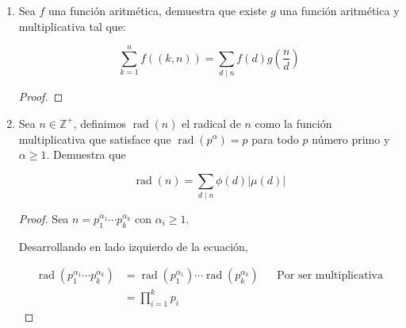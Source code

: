 \documentclass[letterpaper]{article}
\newcommand{\Z}{\mathbb{Z}}
\DeclareMathOperator{\rad}{rad}
\begin{document}
\begin{enumerate}
Ahora solo hace falta probar $(*)$, ósea
\[
    \sum_{i=1}^{n}i^3 = \left( \sum_{i=1}^{n}i \right)^2
\]
\begin{proof} \textbf{Por inducción}

    Tenemos que $\sum_{i=1}^{n} i = \frac{n(n+1)}{2}$, entonces
    $\left( \sum_{i=1}^{n} i \right)^2 = \frac{n^2(n+1)^2}{4}$.
    Mostrar por inducción que
    \[
        \sum_{i=1}^{n}i^3 = \frac{n^2(n+1)^2}{4}
    \]
    \emph{Paso inductivo con $n=k+1$,}
    \begin{align*}
        \sum_{i=1}^{k+1}i^3
            &= \sum_{i=1}^{k}i^3 + (k+1)^3\\
            &= \frac{k^2(k+1)^2}{4} + (k+1)^3\\
            &= \frac{k^4 + 2k^3 + k^2}{4} + \frac{4k^3 + 12k^2 + 12k + 4} {4}\\
            &= \frac {k^4 + 6k^3 + 13k^2 + 12k + 4} {4}\\
            &= \frac {(k + 1)^2 (k + 2)^2} {4}
    \end{align*}
\end{proof}
Por tanto $\sum_{d \mid n} \tau(d)^3 = \left( \sum_{d \mid n} \tau(d) \right)^2$.
\item Sea $f$ una función aritmética, demuestra que existe $g$ una función aritmética y multiplicativa tal que:

\[ \sum_{k=1}^{n} f((k,n)) = \sum_{d \mid n} f(d)g \left( \frac{n}{d} \right) \]

\begin{proof}
    
\end{proof}

\item Sea $n \in \Z^+$, definimos $\rad(n)$ el radical de $n$ como la función multiplicativa que satisface que
$\rad(p^\alpha) = p$ para todo $p$ número primo y $\alpha \geq 1$. Demuestra que

\[ \rad(n) = \sum_{d \mid n} \phi(d) |\mu(d)| \]

\begin{proof}
Sea $n = p_1^{\alpha_1} \cdots p_k^{\alpha_k}$ con $\alpha_i \geq 1$.

Desarrollando en lado izquierdo de la ecuación,

\begin{align*}
    \rad(p_1^{\alpha_1} \cdots p_k^{\alpha_k})
        &= \rad(p_1^{\alpha_1}) \cdots \rad(p_k^{\alpha_k})
        && \text{Por ser multiplicativa}\\
        &= \prod_{i=1}^k p_i
\end{align*}


\end{proof}
\end{enumerate}
\end{document}

